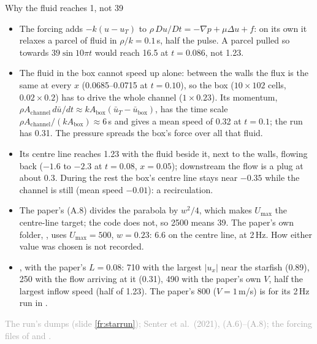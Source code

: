 \documentclass[aspectratio=169,11pt]{beamer}
\newcommand{\sourcecredit}[1]{\vfill\hfill{\tiny\textcolor{DarkGray}{#1}}}
\begin{document}
\begin{frame}{Why the fluid reaches 1, not 39}
\label{fr:penalty}
\footnotesize
\begin{itemize}
  \item {} The forcing adds $-k(u - u_T)$ to $\rho\,Du/Dt = -\nabla p + \mu\Delta u + f$: on its own it relaxes a parcel of fluid in $\rho/k = 0.1$\,s, half the pulse. A parcel pulled so towards $39\sin 10\pi t$ would reach 16.5 at $t = 0.086$, not 1.23.
  \item {} The fluid in the box cannot speed up alone: between the walls the flux is the same at every $x$ (0.0685--0.0715 at $t = 0.10$), so the box ($10 \times 102$ cells, $0.02 \times 0.2$) has to drive the whole channel ($1 \times 0.23$). Its momentum, $\rho A_{\text{channel}}\,d\bar u/dt \approx k A_{\text{box}} (\bar u_T - \bar u_{\text{box}})$, has the time scale $\rho A_{\text{channel}}/(k A_{\text{box}}) \approx 6$\,s and gives a mean speed of 0.32 at $t = 0.1$; the run has 0.31. The pressure spreads the box's force over all that fluid.
  \item {} Its centre line reaches 1.23 with the fluid beside it, next to the walls, flowing back ($-1.6$ to $-2.3$ at $t = 0.08$, $x = 0.05$); downstream the flow is a plug at about 0.3. During the rest the box's centre line stays near $-0.35$ while the channel is still (mean speed $-0.01$): a recirculation.
  \item {} The paper's (A.8) divides the parabola by $w^2/4$, which makes $U_{\max}$ the centre-line target; the code does not, so 2500 means 39. The paper's own folder, , uses $U_{\max} = 500$, $w = 0.23$: 6.6 on the centre line, at 2\,Hz. How either value was chosen is not recorded.
  \item {}, with the paper's $L = 0.08$: 710 with the largest $|u_x|$ near the starfish (0.89), 250 with the flow arriving at it (0.31), 490 with the paper's own $V$, half the largest inflow speed (half of 1.23). The paper's 800 ($V = 1$\,m/s) is for its 2\,Hz run in .
\end{itemize}
\sourcecredit{The run's  dumps (slide \ref{fr:starrun}); Senter et al.\ (2021), (A.6)--(A.8); the forcing files of \code{Flow\_Around\_Starfish} and \code{Starfish}.}
\end{frame}
\end{document}
